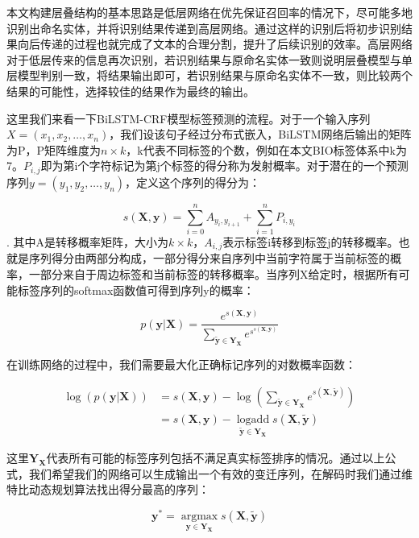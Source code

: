 \documentclass[winfonts,master,oneside,nobackinfo]{njuthesis}
\begin{document}
本文构建层叠结构的基本思路是低层网络在优先保证召回率的情况下，尽可能多地识别出命名实体，并将识别结果传递到高层网络。通过这样的识别后将初步识别结果向后传递的过程也就完成了文本的合理分割，提升了后续识别的效率。高层网络对于低层传来的信息再次识别，若识别结果与原命名实体一致则说明层叠模型与单层模型判别一致，将结果输出即可，若识别结果与原命名实体不一致，则比较两个结果的可能性，选择较佳的结果作为最终的输出。

这里我们来看一下BiLSTM-CRF模型标签预测的流程。对于一个输入序列$X=\left(x_{1}, x_{2}, \ldots, x_{n}\right)$，我们设该句子经过分布式嵌入，BiLSTM网络后输出的矩阵为P，P矩阵维度为$n \times k$，k代表不同标签的个数，例如在本文BIO标签体系中k为7。$P_{i, j}$即为第i个字符标记为第j个标签的得分称为发射概率。对于潜在的一个预测序列$y=\left(y_{1}, y_{2}, \ldots, y_{n}\right)$，定义这个序列的得分为：

\begin{equation} 
s(\bm{X}, \bm{y})=\sum_{i=0}^{n} A_{y_{i}, y_{i+1}}+\sum_{i=1}^{n} P_{i, y_{i}}
\end{equation}
.
其中A是转移概率矩阵，大小为$k \times k$，$A_{i, j}$表示标签i转移到标签j的转移概率。也就是序列得分由两部分构成，一部分得分来自序列中当前字符属于当前标签的概率，一部分来自于周边标签和当前标签的转移概率。当序列X给定时，根据所有可能标签序列的softmax函数值可得到序列y的概率：

\begin{equation} 
p(\bm{y} | \bm{X})=\frac{e^{s(\bm{X}, \bm{y})}}{\sum_{\tilde{\bm{y}} \in \bm{Y}_{\bm{X}}} e^{s^{s(\bm{X}, \overline{\bm{y}})}}}
\end{equation}

在训练网络的过程中，我们需要最大化正确标记序列的对数概率函数：

\begin{equation} 
\begin{aligned} \log (p(\bm{y} | \bm{X})) &=s(\bm{X}, \bm{y})-\log \left(\sum_{\tilde{\bm{y}} \in \bm{Y}_{\bm{X}}} e^{s(\bm{X}, \widetilde{\bm{y}})}\right) \\ &=s(\bm{X}, \bm{y})-\operatorname*{logadd}\limits_{\widetilde{\bm{y}} \in \bm{Y}_{\bm{X}}} s(\bm{X}, \widetilde{\bm{y}}) \end{aligned}
\end{equation}

这里$\bm{Y}_{\bm{X}}$代表所有可能的标签序列包括不满足真实标签排序的情况。通过以上公式，我们希望我们的网络可以生成输出一个有效的变迁序列，在解码时我们通过维特比动态规划算法找出得分最高的序列：

\begin{equation} 
\bm{y}^{*}=\underset{\bm{y} \in \bm{Y}_{\bm{X}}}{\operatorname{argmax}} s(\bm{X}, \widetilde{\bm{y}})
\end{equation}
\end{document}
